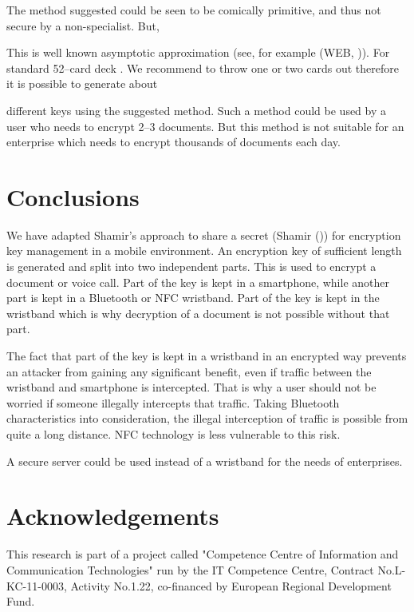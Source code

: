 \documentclass{bjmc}
\begin{document}
The method suggested could be seen to be comically primitive, and thus not secure by a non-specialist. But, 

This is well known  asymptotic approximation (see, for example  (WEB,  \cite{Wik})).   
For standard 52--card deck .
We recommend to throw one or two cards out  therefore  it is possible to generate about 

different keys using the suggested method.  Such a method could be used by a user who needs to encrypt 2--3 documents. 
But this method is not suitable for an enterprise which needs to encrypt  thousands of documents each day.


\section{Conclusions}

We have adapted Shamir's approach to share a secret (Shamir (\cite{Sha})) for encryption key management in a mobile environment.
An encryption key of sufficient length is generated and split into two independent parts. This is used to encrypt a document or voice call. Part of the key is kept in a smartphone, 
while another part is kept in a Bluetooth or NFC wristband. Part of the key is kept in the wristband 
which is why decryption of a document is not possible without that part.

The fact that part of the key is kept in a wristband in an encrypted way prevents an attacker from gaining  any significant benefit, even if traffic between the wristband and 
smartphone is intercepted. That is why a user should not be worried if someone illegally intercepts that traffic. Taking Bluetooth characteristics into consideration,
the illegal interception of traffic is possible from  quite a long distance. NFC technology is less vulnerable to this risk.

A secure server could be used instead of a wristband for the needs of enterprises.

\section{Acknowledgements}

This research is part of a project called "Competence Centre of Information and Communication Technologies" run by the IT Competence Centre, 
Contract No.L-KC-11-0003, Activity No.1.22, co-financed by European Regional Development Fund.
\end{document}
